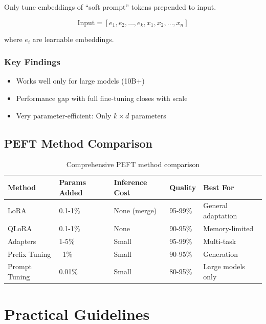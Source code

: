 Only tune embeddings of ``soft prompt'' tokens prepended to input.

\begin{equation}
\text{Input} = [e_1, e_2, \ldots, e_k, x_1, x_2, \ldots, x_n]
\end{equation}

where $e_i$ are learnable embeddings.

\subsubsection{Key Findings}

\begin{itemize}
    \item Works well only for large models (10B+)
    \item Performance gap with full fine-tuning closes with scale
    \item Very parameter-efficient: Only $k \times d$ parameters
\end{itemize}

\subsection{PEFT Method Comparison}

\begin{table}[H]
\centering
\caption{Comprehensive PEFT method comparison}
\begin{tabularx}{\textwidth}{lXXXX}
\toprule
\textbf{Method} & \textbf{Params Added} & \textbf{Inference Cost} & \textbf{Quality} & \textbf{Best For} \\
\midrule
LoRA & 0.1-1\% & None (merge) & 95-99\% & General adaptation \\
QLoRA & 0.1-1\% & None & 90-95\% & Memory-limited \\
Adapters & 1-5\% & Small & 95-99\% & Multi-task \\
Prefix Tuning & ~1\% & Small & 90-95\% & Generation \\
Prompt Tuning & 0.01\% & Small & 80-95\% & Large models only \\
\bottomrule
\end{tabularx}
\end{table}

\section{Practical Guidelines}
\label{sec:transfer_practical}

